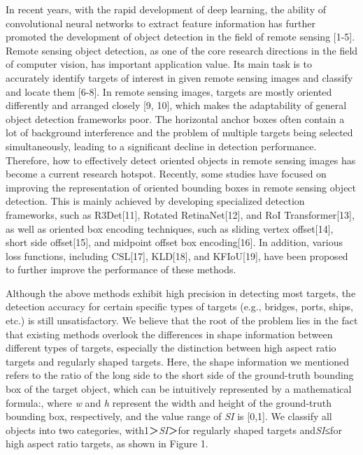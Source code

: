 \documentclass[10pt,twocolumn,final]{article}
\begin{document}
In recent years, with the rapid development of deep learning, the ability of convolutional neural networks to extract feature information has further promoted the development of object detection in the field of remote sensing [1-5]. Remote sensing object detection, as one of the core research directions in the field of computer vision, has important application value. Its main task is to accurately identify targets of interest in given remote sensing images and classify and locate them [6-8]. In remote sensing images, targets are mostly oriented differently and arranged closely [9, 10], which makes the adaptability of general object detection frameworks poor. The horizontal anchor boxes often contain a lot of background interference and the problem of multiple targets being selected simultaneously, leading to a significant decline in detection performance. Therefore, how to effectively detect oriented objects in remote sensing images has become a current research hotspot. Recently, some studies have focused on improving the representation of oriented bounding boxes in remote sensing object detection. This is mainly achieved by developing specialized detection frameworks, such as R3Det[11], Rotated RetinaNet[12], and RoI Transformer[13], as well as oriented box encoding techniques, such as sliding vertex offset[14], short side offset[15], and midpoint offset box encoding[16]. In addition, various loss functions, including CSL[17], KLD[18], and KFIoU[19], have been proposed to further improve the performance of these methods.

Although the above methods exhibit high precision in detecting most targets, the detection accuracy for certain specific types of targets (e.g., bridges, ports, ships, etc.) is still unsatisfactory. We believe that the root of the problem lies in the fact that existing methods overlook the differences in shape information between different types of targets, especially the distinction between high aspect ratio targets and regularly shaped targets. Here, the shape information we mentioned refers to the ratio of the long side to the short side of the ground-truth bounding box of the target object, which can be intuitively represented by a mathematical formula:, where \textit{w} and \textit{h} represent the width and height of the ground-truth bounding box, respectively, and the value range of \textit{SI} is [0,1]. We classify all objects into two categories, with1＞\textit{SI}＞for regularly shaped targets and\textit{SI}≤for high aspect ratio targets, as shown in Figure 1.
\end{document}

